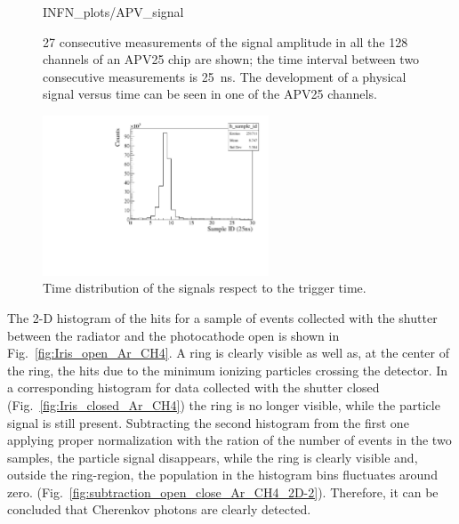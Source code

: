 \begin{enumerate}
\begin{figure}
\begin{center}
                			{INFN_plots/APV_signal}
				\caption{\label{fig:APV_signal}
               27 consecutive measurements of the signal amplitude  in all the 128 channels of an APV25 chip are shown; the time interval between two consecutive measurements is 25~ns. The development of a physical signal versus time can be seen in one of the APV25 channels.
                }
			\end{center}
            \end{figure} 
\begin{figure}
			\begin{center}
			\includegraphics[width=0.6\textwidth]
                			{INFN_plots/timing_plot-1}
				\caption{\label{fig:timing_plot-1}
               Time distribution of the signals respect to the trigger 
               time. }
			\end{center}
            \end{figure} 
       The 2-D histogram of the hits for a sample of events collected with the shutter between the radiator and the photocathode open is shown in Fig.~\ref{fig:Iris_open_Ar_CH4}. A ring is clearly visible as well as, at the center of the ring, the hits due to the minimum ionizing particles crossing the detector. In a corresponding histogram for data collected with the shutter closed (Fig.~\ref{fig:Iris_closed_Ar_CH4}) the ring is no longer visible, while the particle signal is still present. Subtracting the second histogram from the first one applying proper normalization with the ration of the number of events in the two samples, the particle signal disappears, while the ring is clearly visible and, outside the ring-region, the population in the histogram bins fluctuates around zero. (Fig.~\ref{fig:subtraction_open_close_Ar_CH4_2D-2}).  Therefore, it can be concluded that Cherenkov photons are clearly detected.   \par   %

\end{enumerate}
